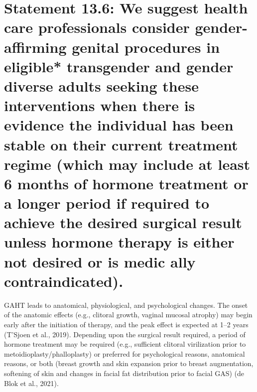 \documentclass[
]{book}
\begin{document}
\hypertarget{statement-13.6-we-suggest-health-care-professionals-consider-gender-affirming-genital-procedures-in-eligible-transgender-and-gender-diverse-adults-seeking-these-interventions-when-there-is-evidence-the-individual-has-been-stable-on-their-current-treatment-regime-which-may-include-at-least-6-months-of-hormone-treatment-or-a-longer-period-if-required-to-achieve-the-desired-surgical-result-unless-hormone-therapy-is-either-not-desired-or-is-medic-ally-contraindicated.}{%
\section*{Statement 13.6: We suggest health care professionals consider gender-affirming genital procedures in eligible* transgender and gender diverse adults seeking these interventions when there is evidence the individual has been stable on their current treatment regime (which may include at least 6 months of hormone treatment or a longer period if required to achieve the desired surgical result unless hormone therapy is either not desired or is medic ally contraindicated).}\label{statement-13.6-we-suggest-health-care-professionals-consider-gender-affirming-genital-procedures-in-eligible-transgender-and-gender-diverse-adults-seeking-these-interventions-when-there-is-evidence-the-individual-has-been-stable-on-their-current-treatment-regime-which-may-include-at-least-6-months-of-hormone-treatment-or-a-longer-period-if-required-to-achieve-the-desired-surgical-result-unless-hormone-therapy-is-either-not-desired-or-is-medic-ally-contraindicated.}}

GAHT leads to anatomical, physiological, and
psychological changes. The onset of the anatomic effects (e.g., clitoral growth, vaginal mucosal atrophy) may begin early after the initiation
of therapy, and the peak effect is expected at
1--2 years (T'Sjoen et al., 2019). Depending upon
the surgical result required, a period of hormone
treatment may be required (e.g., sufficient clitoral virilization prior to metoidioplasty/phalloplasty) or preferred for psychological reasons,
anatomical reasons, or both (breast growth and
skin expansion prior to breast augmentation,
softening of skin and changes in facial fat distribution prior to facial GAS) (de Blok
et al., 2021).
\end{document}
